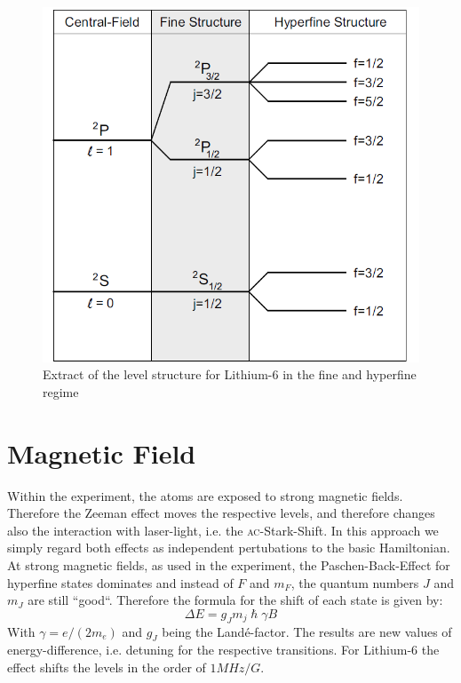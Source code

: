 \begin{figure}[H]

\begin{center}
\includegraphics[scale=.5] {levels1}
\end{center}
\caption{Extract of the level structure for Lithium-6 in the fine and hyperfine regime \cite{gehm}}
\label{levels1}
\end{figure}

\section{Magnetic Field}

Within the experiment, the atoms are exposed to strong magnetic fields. Therefore the Zeeman effect moves the respective levels, and therefore changes also the interaction with laser-light, i.e. the \textsc{ac}-Stark-Shift. In this approach we simply regard both effects as independent pertubations to the basic Hamiltonian. At strong magnetic fields, as used in the experiment, the Paschen-Back-Effect for hyperfine states dominates and instead of $F$ and $m_F$, the quantum numbers $J$ and $m_J$ are still “good“. Therefore the formula for the shift of each state is given by:
\begin{equation}
\Delta E=g_Jm_j\hslash\gamma B
\end{equation}
With $\gamma=e/(2m_e)$ and $g_J$ being the Landé-factor. The results are new values of energy-difference, i.e. detuning for the respective transitions. For Lithium-6 the effect shifts the levels in the order of $1\unit{MHz/G}$.

